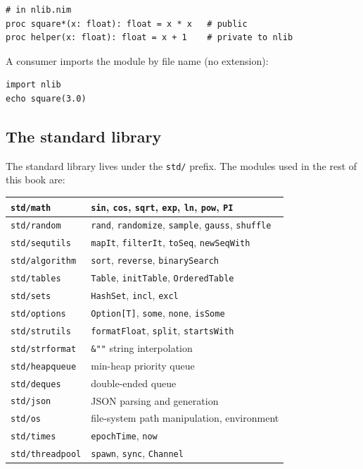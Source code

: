 \documentclass[justified, sixbynine]{tufte-book}
\def\ft{\small\tt}
\theoremstyle{plain}%
\newtheorem * {corollary}{Corollary}
\theoremstyle{definition}
\theoremstyle{remark}
\newtheorem * {remark}{Remark}
\newtheorem * {note}{Note}
\begin{document}
\begin{fullwidth}
\begin{lstlisting}
# in nlib.nim
proc square*(x: float): float = x * x   # public
proc helper(x: float): float = x + 1    # private to nlib
\end{lstlisting}

A consumer imports the module by file name (no extension):

\begin{lstlisting}
import nlib
echo square(3.0)
\end{lstlisting}

\goodbreak\subsection{The standard library}

The standard library lives under the {\ft std/} prefix. The modules used in the rest of this book are:

\begin{tabular}{|l|l|}\hline
{\ft std/math}        & {\ft sin}, {\ft cos}, {\ft sqrt}, {\ft exp}, {\ft ln}, {\ft pow}, {\ft PI} \\ \hline
{\ft std/random}      & {\ft rand}, {\ft randomize}, {\ft sample}, {\ft gauss}, {\ft shuffle} \\ \hline
{\ft std/sequtils}    & {\ft mapIt}, {\ft filterIt}, {\ft toSeq}, {\ft newSeqWith} \\ \hline
{\ft std/algorithm}   & {\ft sort}, {\ft reverse}, {\ft binarySearch} \\ \hline
{\ft std/tables}      & {\ft Table}, {\ft initTable}, {\ft OrderedTable} \\ \hline
{\ft std/sets}        & {\ft HashSet}, {\ft incl}, {\ft excl} \\ \hline
{\ft std/options}     & {\ft Option[T]}, {\ft some}, {\ft none}, {\ft isSome} \\ \hline
{\ft std/strutils}    & {\ft formatFloat}, {\ft split}, {\ft startsWith} \\ \hline
{\ft std/strformat}   & {\ft \&""} string interpolation \\ \hline
{\ft std/heapqueue}   & min-heap priority queue \\ \hline
{\ft std/deques}      & double-ended queue \\ \hline
{\ft std/json}        & JSON parsing and generation \\ \hline
{\ft std/os}          & file-system path manipulation, environment \\ \hline
{\ft std/times}       & {\ft epochTime}, {\ft now} \\ \hline
{\ft std/threadpool}  & {\ft spawn}, {\ft sync}, {\ft Channel} \\ \hline
\end{tabular}


\end{fullwidth}
\end{document}
